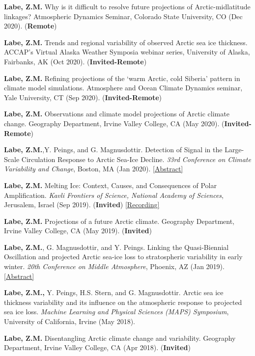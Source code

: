 \documentclass[margin,line,palatino,courier,10pt]{res}
\begin{document}
\begin{resume}
\begin{etaremune}[leftmargin=0in,topsep=0in,parsep=0in]
\item \textbf{Labe, Z.M.} Why is it difficult to resolve future projections of Arctic-midlatitude linkages? Atmospheric Dynamics Seminar, Colorado State University, CO (Dec 2020). (\textbf{Remote})
\item \textbf{Labe, Z.M.} Trends and regional variability of observed Arctic sea ice thickness. ACCAP’s Virtual Alaska Weather Symposia webinar series, University of Alaska, Fairbanks, AK (Oct 2020). (\textbf{Invited-Remote})
\item \textbf{Labe, Z.M.} Refining projections of the `warm Arctic, cold Siberia' pattern in climate model simulations. Atmosphere and Ocean Climate Dynamics seminar, Yale University, CT (Sep 2020). (\textbf{Invited-Remote})
\item \textbf{Labe, Z.M.} Observations and climate model projections of Arctic climate change. Geography Department, Irvine Valley College, CA (May 2020). (\textbf{Invited-Remote})
\item \textbf{Labe, Z.M.},Y. Peings, and G. Magnusdottir. Detection of Signal in the Large-Scale Circulation Response to Arctic Sea-Ice Decline. \textit{33rd Conference on Climate Variability and Change}, Boston, MA (Jan 2020). \href{https://ams.confex.com/ams/2020Annual/meetingapp.cgi/Paper/367289}{[Abstract]}
\item \textbf{Labe, Z.M.} Melting Ice: Context, Causes, and Consequences of Polar Amplification. \textit{Kavli Frontiers of Science, National Academy of Sciences}, Jerusalem, Israel (Sep 2019). (\textbf{Invited}) \href{https://vimeo.com/362912204}{[Recording]}
\item \textbf{Labe, Z.M.} Projections of a future Arctic climate. Geography Department, Irvine Valley College, CA (May 2019). (\textbf{Invited})
\item \textbf{Labe, Z.M.}, G. Magnusdottir, and Y. Peings. Linking the Quasi-Biennial Oscillation and projected Arctic sea-ice loss to stratospheric variability in early winter. \textit{20th Conference on Middle Atmosphere}, Phoenix, AZ (Jan 2019). \href{https://ams.confex.com/ams/2019Annual/meetingapp.cgi/Paper/352664}{[Abstract]}
\item \textbf{Labe, Z.M.,} Y. Peings, H.S. Stern, and G. Magnusdottir. Arctic sea ice thickness variability and its influence on the atmospheric response to projected sea ice loss. \textit{Machine Learning and Physical Sciences (MAPS) Symposium}, University of California, Irvine (May 2018). 
\item \textbf{Labe, Z.M.} Disentangling Arctic climate change and variability. Geography Department, Irvine Valley College, CA (Apr 2018). (\textbf{Invited})

\end{etaremune}
\end{resume}
\end{document}
